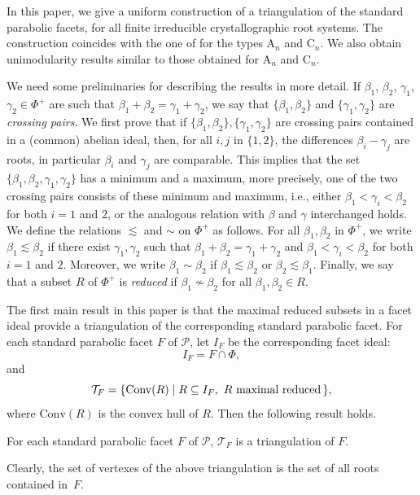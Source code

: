\documentclass[ALCO,published]{cedram}
\newcommand\pol{\mathcal P}
\theoremstyle{plain}
\newcommand\mc{\mathcal}
\newcommand\pol{\mathcal P}
\newcommand\conv{\mathrm{Conv}}
\newcommand\be{\beta}
\newcommand\ga{\gamma}
\newcommand\nosim{\not\sim}
\begin{document}
\par
In this paper, we give a uniform construction of a triangulation of the standard parabolic facets,  for all finite irreducible crystallographic root systems. 
The construction coincides with the one of \cite{CM2} for the types $\mathrm A_n$ and $\mathrm C_n$.  
We also obtain unimodularity results similar to those obtained for $\mathrm A_n$ and $\mathrm C_n$.  

\par
We need some preliminaries for describing the results in more detail.
If $\be_1$, $\be_2$, $\ga_1$, $\ga_2\in \Phi^+$ are such that $\be_1+\be_2=\ga_1+\ga_2$, we say that $\{\be_1, \be_2\}$ and $\{\ga_1, \ga_2\}$ are {\it crossing pairs}. 
We first prove that if $\{\be_1,\be_2\}, \{\ga_1, \ga_2\}$ are crossing pairs contained in a (common) abelian ideal,  then, for all $i, j$ in $\{1, 2\}$, the differences $\be_i-\ga_j$ are roots, in particular  $\be_i$ and $\ga_j$ are comparable. 
This implies that the set $\{\be_1,\be_2, \ga_1, \ga_2\}$ has a minimum and a maximum, more precisely, one of the two crossing pairs consists of these minimum and maximum, i.e., either $\be_1< \ga_i< \be_2$ for both $i=1$ and $2$, or the analogous relation with $\be$ and $\ga$ interchanged holds.
We define the relations $\lesssim$ and $\sim$ on $\Phi^+$ as follows.
For all $\be_1, \be_2$ in $\Phi^+$, we write $\be_1\lesssim \be_2$ if there exist 
$\ga_1, \ga_2$ such that $\be_1+\be_2=\ga_1+\ga_2$ and $\be_1< \ga_i< \be_2$ for both $i=1$ and $2$. 
Moreover, we write $\be_1\sim \be_2$ if $\be_1\lesssim \be_2$ or $\be_2\lesssim \be_1$.
Finally, we say that a subset $R$ of $\Phi^+$ is {\it reduced} if $\be_1\nosim \be_2$ for all $\be_1, \be_2\in R$.  

\par
The first main result in this paper is that the maximal reduced subsets in a facet ideal provide a triangulation of the corresponding standard parabolic facet.
For each standard parabolic facet $F$ of $\pol$, let $I_F$ be the corresponding facet ideal:
$$
I_F=F\cap \Phi,
$$
and
$$
\mc T_F=\{\conv(R)\mid R\subseteq I_F,\ R \text { maximal reduced\,}\},
$$
where $\conv(R)$ is the convex hull of $R$. 
Then the following result holds.

\begin{thm}\label{thm:main1-intro}
For each standard parabolic facet  $F$ of $\pol$,  $\mc T_F$ is a triangulation of $F$.
\end{thm}

\par
Clearly, the set of vertexes of the above triangulation is the set of all roots contained in~$F$. 
\end{document}
